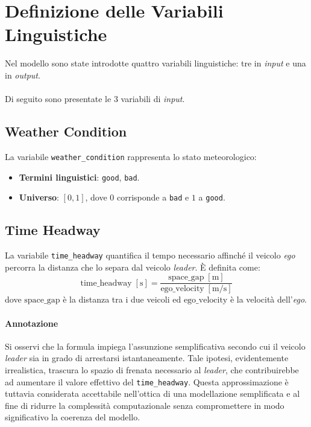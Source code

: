\section{Definizione delle Variabili Linguistiche}

Nel modello sono state introdotte quattro variabili linguistiche: tre in \emph{input} e una in \emph{output}.
\\\\
Di seguito sono presentate le 3 variabili di \emph{input}.

\subsection{Weather Condition}
La variabile \texttt{weather\_condition} rappresenta lo stato meteorologico:
\begin{itemize}
  \item \textbf{Termini linguistici}: \texttt{good}, \texttt{bad}.
  \item \textbf{Universo}: \([0,1]\), dove \(0\) corrisponde a \texttt{bad} e \(1\) a \texttt{good}.
\end{itemize}

\subsection{Time Headway}
La variabile \texttt{time\_headway} quantifica il tempo necessario affinché il veicolo \emph{ego} 
percorra la distanza che lo separa dal veicolo \emph{leader}. È definita come:
\[
\text{time\_headway} \; [\mathrm{s}]
= \frac{\text{space\_gap}\;[\mathrm{m}]}{\text{ego\_velocity}\;[\mathrm{m/s}]}
\]
dove \(\text{space\_gap}\) è la distanza tra i due veicoli ed \(\text{ego\_velocity}\) è la velocità dell'\emph{ego}. 
\paragraph{Annotazione} Si osservi che la formula impiega l'assunzione semplificativa 
secondo cui il veicolo \emph{leader} sia in grado di arrestarsi istantaneamente. 
Tale ipotesi, evidentemente irrealistica, trascura lo spazio di frenata necessario al \emph{leader}, 
che contribuirebbe ad aumentare il valore effettivo del \texttt{time\_headway}. Questa approssimazione 
è tuttavia considerata accettabile nell'ottica di una modellazione semplificata e al fine di ridurre la 
complessità computazionale senza compromettere in modo significativo la coerenza del modello.


